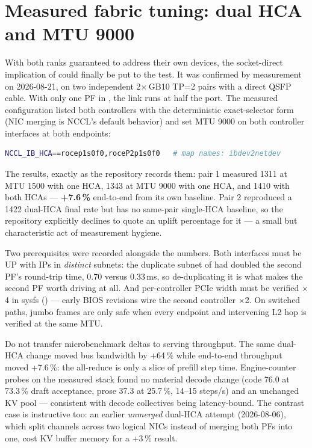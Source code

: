 \section{Measured fabric tuning: dual HCA and MTU 9000}
\label{sec:fabric-measured}

With both ranks guaranteed to address their own devices, the socket-direct
implication of  could finally be put to the test.
It was confirmed by measurement on 2026-08-21, on two independent
2$\times$\,GB10 TP=2 pairs with a direct QSFP cable. With only one PF in , the link
runs at half the port. The measured configuration listed both controllers
with the deterministic exact-selector form (NIC merging is NCCL's default
behavior) and set MTU 9000 on both controller interfaces at both endpoints:

\begin{lstlisting}[language=bash]
NCCL_IB_HCA==rocep1s0f0,roceP2p1s0f0   # map names: ibdev2netdev
\end{lstlisting}

The results, exactly as the repository records them: pair 1 measured 1311 \tokspersec{}
at MTU 1500 with one HCA, 1343 \tokspersec{} at MTU 9000 with one HCA, and 1410
\tokspersec{} with both HCAs --- \textbf{+7.6\,\%} end-to-end from its own
baseline. Pair 2 reproduced a 1422 \tokspersec{} dual-HCA final rate but has no
same-pair single-HCA baseline, so the repository explicitly declines to quote an
uplift percentage for it --- a small but characteristic act of measurement
hygiene.

Two prerequisites were recorded alongside the numbers. Both interfaces must
be UP with IPs in \emph{distinct} subnets: the duplicate subnet of
 had doubled the second PF's round-trip time,
0.70 versus 0.33\,ms, so de-duplicating it is what makes the second PF
worth driving at all. And per-controller PCIe width must be verified
$\times$4 in sysfs () --- early BIOS revisions wire
the second controller $\times$2. On switched paths, jumbo frames are only safe when
every endpoint and intervening L2 hop is verified at the same MTU.

\begin{hbnote}
Do not transfer microbenchmark deltas to serving throughput. The same
dual-HCA change moved  bus bandwidth by +64\,\% while
end-to-end throughput moved +7.6\,\%: the all-reduce is only a slice of
prefill step time. Engine-counter probes on the measured stack found no
material decode change (code 76.0 \tokspersec{} at 73.3\,\% draft acceptance,
prose 37.3 at 25.7\,\%, 14--15 steps/s) and an unchanged KV pool ---
consistent with decode collectives being latency-bound. The contrast case
is instructive too: an earlier \emph{unmerged} dual-HCA attempt
(2026-08-06), which split channels across two logical NICs instead of
merging both PFs into one, cost KV buffer memory for a +3\,\% result.
\end{hbnote}

